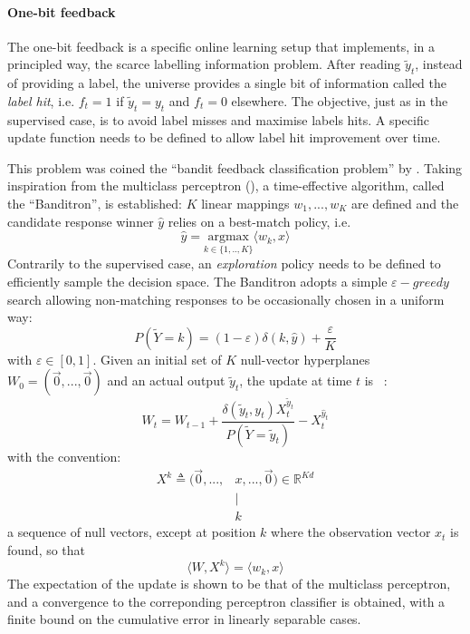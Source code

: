 \documentclass[preprint,12pt,authoryear]{elsarticle}
\begin{document}
\paragraph{One-bit feedback}
The one-bit feedback is a specific online learning setup that implements, in a principled way, the scarce labelling information problem. After reading $\tilde{y}_t$, instead of providing a label, the universe provides a single bit of information called the \textit{label hit}, i.e. $f_t = 1$ if  $\tilde{y}_t=y_t$ and $f_t = 0$ elsewhere. The objective, just as in the supervised case, is to avoid label misses and maximise labels hits. A specific update function needs to be defined to allow label hit improvement over time. 

This problem was coined the ``bandit feedback classification problem'' by \cite{kakade2008efficient}. Taking inspiration from the multiclass perceptron (\cite{duda1973pattern}), a time-effective algorithm, called the ``Banditron'', is established:
$K$ linear mappings $w_1, ..., w_K$ are defined and the candidate response winner $\hat{y}$ relies on a best-match policy, i.e.
\begin{equation}\label{eq:argmax}
\hat{y} = \underset{k \in\{1,..,K\}}{\text{argmax}}  \langle w_k, x \rangle
\end{equation}
Contrarily to the supervised case, an \textit{exploration} policy needs to be defined to efficiently sample the decision space. The Banditron adopts a simple  $\varepsilon-greedy$ search allowing  non-matching responses to be occasionally chosen in a uniform way:
\begin{equation}\label{eq:eps-greedy}
P(\tilde{Y}=k) = (1-\varepsilon) \delta(k,\hat{y}) + \frac{\varepsilon}{K}
\end{equation}
 with $\varepsilon \in [0,1]$.
Given an initial set of $K$ null-vector hyperplanes $W_0 = (\vec{0}, ..., \vec{0})$ and an actual output $\tilde{y}_t$, the update at time $t$ is ~:
\begin{equation} \label{eq:banditron-update}
W_t = W_{t-1} + \frac{\delta(\tilde{y}_t ,y_t) X_t^{\tilde{y}_t}}{P(\tilde{Y}=\tilde{y}_t)} - X_t^{\hat{y}_t}
\end{equation}   
with the convention:
\begin{align}\label{eq:X}
X^k \triangleq (\vec{0}, ..., & x, ..., \vec{0}) \in \mathbb{R}^{K d}\\
&\mid\nonumber\\
&k\nonumber
\end{align}
 a sequence of null vectors, except at position $k$ where the observation vector $x_t$ is found, so that 
 \begin{equation}\label{eq:simil-dot-product}
 \langle W, X^k\rangle = \langle w_k, x\rangle
 \end{equation}
The expectation of the update is shown to be that of the multiclass perceptron, and a convergence to the correponding perceptron classifier is obtained, with a finite bound on the cumulative error in linearly separable cases. 
\end{document}
